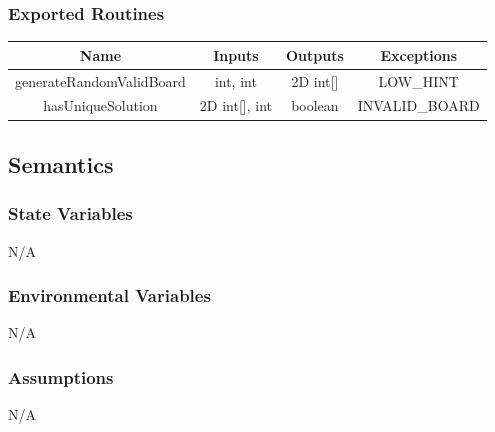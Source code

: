 \documentclass[11pt]{article}
\begin{document}
		\subsubsection{Exported Routines}
		\begin{tabular}[width=\textwidth, pos]{|c|c|c|c|}
			
			\hline
			\textbf{Name}& \textbf{Inputs} & \textbf{Outputs} & \textbf{Exceptions} \\ \hline
			generateRandomValidBoard & int, int & 2D int[] & LOW\_HINT \\ 
			hasUniqueSolution & 2D int[], int & boolean & INVALID\_BOARD \\ 
			\hline
			
		\end{tabular}
		
		\subsection{Semantics}
		\subsubsection{State Variables}
		N/A
		
		\subsubsection{Environmental Variables}
		N/A
		
		\subsubsection{Assumptions}
		N/A
		
\end{document}
